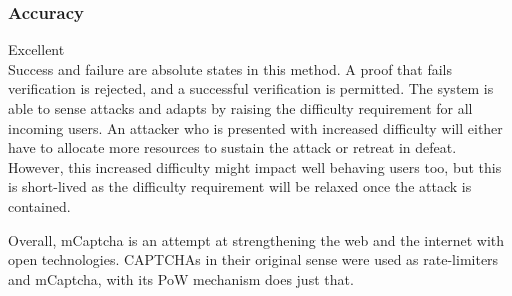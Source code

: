 \subsubsection{Accuracy}
Excellent\\

Success and failure are absolute states in this method. A proof that fails
verification is rejected, and a successful verification is permitted. The system
is able to sense attacks and adapts by raising the difficulty requirement for
all incoming users. An attacker who is presented with increased difficulty will
either have to allocate more resources to sustain the attack or retreat in
defeat. However, this increased difficulty might impact well behaving users too,
but this is short-lived as the difficulty requirement will be relaxed once the
attack is contained.

Overall, mCaptcha is an attempt at strengthening the web and the internet with
open technologies. CAPTCHAs in their original sense were used as rate-limiters
and mCaptcha, with its PoW mechanism does just that.
